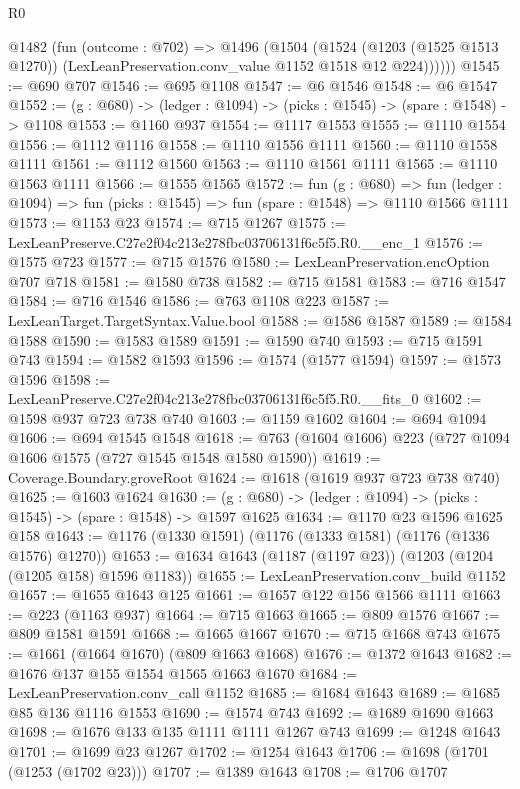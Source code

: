 \begin{lexlean}{R0}
\begin{coremodule}
      @1482
        (fun (outcome : @702) =>
        @1496
          (@1504
            (@1524
              (@1203 (@1525 @1513 @1270))
              (LexLeanPreservation.conv_value @1152 @1518 @12 @224))))))
@1545 := @690 @707
@1546 := @695 @1108
@1547 := @6 @1546
@1548 := @6 @1547
@1552 := (g : @680) -> (ledger : @1094) -> (picks : @1545) -> (spare : @1548) -> @1108
@1553 := @1160 @937
@1554 := @1117 @1553
@1555 := @1110 @1554
@1556 := @1112 @1116
@1558 := @1110 @1556 @1111
@1560 := @1110 @1558 @1111
@1561 := @1112 @1560
@1563 := @1110 @1561 @1111
@1565 := @1110 @1563 @1111
@1566 := @1555 @1565
@1572 := fun (g : @680) =>
  fun (ledger : @1094) => fun (picks : @1545) => fun (spare : @1548) => @1110 @1566 @1111
@1573 := @1153 @23
@1574 := @715 @1267
@1575 := LexLeanPreserve.C27e2f04c213e278fbc03706131f6c5f5.R0.__enc_1
@1576 := @1575 @723
@1577 := @715 @1576
@1580 := LexLeanPreservation.encOption @707 @718
@1581 := @1580 @738
@1582 := @715 @1581
@1583 := @716 @1547
@1584 := @716 @1546
@1586 := @763 @1108 @223
@1587 := LexLeanTarget.TargetSyntax.Value.bool
@1588 := @1586 @1587
@1589 := @1584 @1588
@1590 := @1583 @1589
@1591 := @1590 @740
@1593 := @715 @1591 @743
@1594 := @1582 @1593
@1596 := @1574 (@1577 @1594)
@1597 := @1573 @1596
@1598 := LexLeanPreserve.C27e2f04c213e278fbc03706131f6c5f5.R0.__fits_0
@1602 := @1598 @937 @723 @738 @740
@1603 := @1159 @1602
@1604 := @694 @1094
@1606 := @694 @1545 @1548
@1618 := @763 (@1604 @1606) @223 (@727 @1094 @1606 @1575 (@727 @1545 @1548 @1580 @1590))
@1619 := Coverage.Boundary.groveRoot
@1624 := @1618 (@1619 @937 @723 @738 @740)
@1625 := @1603 @1624
@1630 := (g : @680) -> (ledger : @1094) -> (picks : @1545) -> (spare : @1548) -> @1597 @1625
@1634 := @1170 @23 @1596 @1625 @158
@1643 := @1176 (@1330 @1591) (@1176 (@1333 @1581) (@1176 (@1336 @1576) @1270))
@1653 := @1634 @1643 (@1187 (@1197 @23)) (@1203 (@1204 (@1205 @158) @1596 @1183))
@1655 := LexLeanPreservation.conv_build @1152
@1657 := @1655 @1643 @125
@1661 := @1657 @122 @156 @1566 @1111
@1663 := @223 (@1163 @937)
@1664 := @715 @1663
@1665 := @809 @1576
@1667 := @809 @1581 @1591
@1668 := @1665 @1667
@1670 := @715 @1668 @743
@1675 := @1661 (@1664 @1670) (@809 @1663 @1668)
@1676 := @1372 @1643
@1682 := @1676 @137 @155 @1554 @1565 @1663 @1670
@1684 := LexLeanPreservation.conv_call @1152
@1685 := @1684 @1643
@1689 := @1685 @85 @136 @1116 @1553
@1690 := @1574 @743
@1692 := @1689 @1690 @1663
@1698 := @1676 @133 @135 @1111 @1111 @1267 @743
@1699 := @1248 @1643
@1701 := @1699 @23 @1267
@1702 := @1254 @1643
@1706 := @1698 (@1701 (@1253 (@1702 @23)))
@1707 := @1389 @1643
@1708 := @1706 @1707

\end{coremodule}
\end{lexlean}
